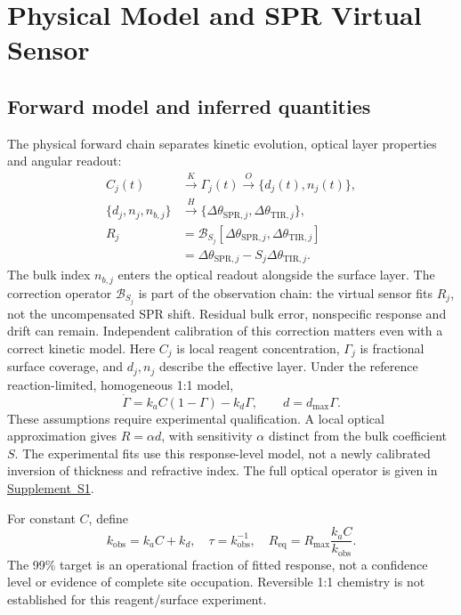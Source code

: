 \documentclass[lettersize,journal]{IEEEtran}
\newcommand{\supp}[1]{\href{SPR_smart_stop_supplement.pdf}{Supplement~#1}}
\begin{document}
\section{Physical Model and SPR Virtual Sensor}
\subsection{Forward model and inferred quantities}
The physical forward chain separates kinetic evolution, optical layer
properties and angular readout:
\begin{equation}\label{eq:forwardcorrected}
\begin{aligned}
 C_j(t)&\xrightarrow{K}\Gamma_j(t)\xrightarrow{O}\{d_j(t),n_j(t)\},\\
 \{d_j,n_j,n_{b,j}\}&\xrightarrow{H}
 \{\Delta\theta_{\mathrm{SPR},j},\Delta\theta_{\mathrm{TIR},j}\},\\
 R_j&=\mathcal B_{S_j}[\Delta\theta_{\mathrm{SPR},j},\Delta\theta_{\mathrm{TIR},j}]\\
 &=\Delta\theta_{\mathrm{SPR},j}-S_j\Delta\theta_{\mathrm{TIR},j}.
\end{aligned}
\end{equation}
The bulk index $n_{b,j}$ enters the optical readout alongside the surface
layer. The correction operator $\mathcal B_{S_j}$ is part of the observation
chain: the virtual sensor fits $R_j$, not the uncompensated SPR shift.
Residual bulk error, nonspecific response and drift can remain. Independent
calibration of this correction matters even with a correct kinetic
model\cite{bulk2022}.
Here $C_j$ is local reagent concentration, $\Gamma_j$ is fractional surface
coverage, and $d_j,n_j$ describe the effective layer. Under the reference
reaction-limited, homogeneous 1:1 model,
\begin{equation}\label{eq:langmuir}
 \dot\Gamma=k_aC(1-\Gamma)-k_d\Gamma,\qquad d=d_{\max}\Gamma.
\end{equation}
These assumptions require experimental qualification. A local optical
approximation gives $R=\alpha d$, with sensitivity $\alpha$ distinct from
the bulk coefficient $S$. The experimental fits use this response-level
model, not a newly calibrated inversion of thickness and refractive index.
The full optical operator is given in \supp{S1}.

For constant $C$, define
\begin{equation}
 k_{\mathrm{obs}}=k_aC+k_d,\quad \tau=k_{\mathrm{obs}}^{-1},\quad
 R_{\mathrm{eq}}=R_{\max}\frac{k_aC}{k_{\mathrm{obs}}}.
\end{equation}
The 99\% target is an operational fraction of fitted response, not a
confidence level or evidence of complete site occupation. Reversible 1:1
chemistry is not established for this reagent/surface experiment.
\end{document}
